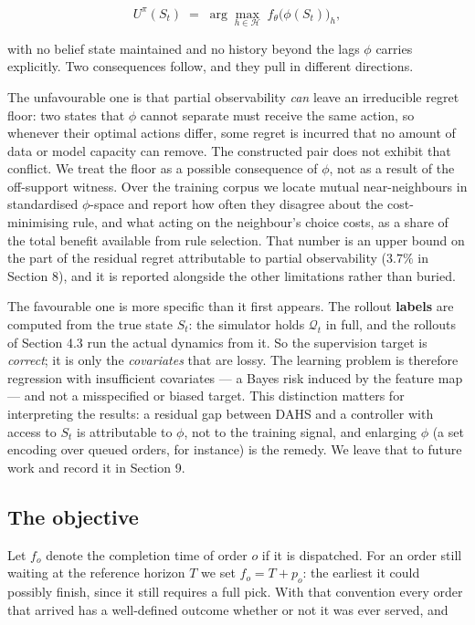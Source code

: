 \documentclass[review,3p,times]{elsarticle}
\theoremstyle{definition}
\begin{document}
\[ U^\pi(S_t) \;=\; \arg\max_{h \in \mathcal{H}} \; f_\theta\big(\phi(S_t)\big)_h , \]

with no belief state maintained and no history beyond the lags \(\phi\)
carries explicitly. Two consequences follow, and they pull in different
directions.

The unfavourable one is that partial observability \emph{can} leave an
irreducible regret floor: two states that \(\phi\) cannot separate must
receive the same action, so whenever their optimal actions differ, some
regret is incurred that no amount of data or model capacity can remove.
The constructed pair does not exhibit that conflict. We treat the floor
as a possible consequence of \(\phi\), not as a result of the
off-support witness. Over the training corpus we locate mutual
near-neighbours in standardised \(\phi\)-space and report how often they
disagree about the cost-minimising rule, and what acting on the
neighbour's choice costs, as a share of the total benefit available from
rule selection. That number is an upper bound on the part of the
residual regret attributable to partial observability (\(3.7\%\) in
Section 8), and it is reported alongside the other limitations rather
than buried.

The favourable one is more specific than it first appears. The rollout
\textbf{labels} are computed from the true state \(S_t\): the simulator
holds \(\mathcal{Q}_t\) in full, and the rollouts of Section 4.3 run the
actual dynamics from it. So the supervision target is \emph{correct}; it
is only the \emph{covariates} that are lossy. The learning problem is
therefore regression with insufficient covariates --- a Bayes risk
induced by the feature map --- and not a misspecified or biased target.
This distinction matters for interpreting the results: a residual gap
between DAHS and a controller with access to \(S_t\) is attributable to
\(\phi\), not to the training signal, and enlarging \(\phi\) (a set
encoding over queued orders, for instance) is the remedy. We leave that
to future work and record it in Section 9.

\subsection{The objective}\label{the-objective}

Let \(f_o\) denote the completion time of order \(o\) if it is
dispatched. For an order still waiting at the reference horizon \(T\) we
set \(f_o = T + p_o\): the earliest it could possibly finish, since it
still requires a full pick. With that convention every order that
arrived has a well-defined outcome whether or not it was ever served,
and
\end{document}
